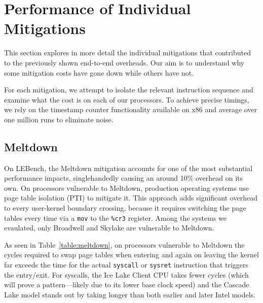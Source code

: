 \section{Performance of Individual Mitigations}
\label{s:evolution-eval}

This section explores in more detail the individual mitigations that contributed
to the previously shown end-to-end overheads.
Our aim is to understand why some mitigation costs have gone down while others have not.

For each mitigation, we attempt to isolate the relevant instruction sequence and examine what the cost is on each of our processors.
To achieve precise timings, we rely on the timestamp counter functionality available on x86 and average over one million runs to eliminate noise.

\subsection{Meltdown}

On LEBench, the Meltdown mitigation accounts for one of the most substantial performance impacts, singlehandedly causing an around 10\% overhead on its own.
On processors vulnerable to Meltdown, production operating systems use page table isolation (PTI) to mitigate it.
This approach adds significant overhead to every user-kernel boundary crossing, because it requires switching the page tables every time via a \texttt{mov} to the \texttt{\%cr3} register.
Among the systems we evaulated, only Broadwell and Skylake are vulnerable to Meltdown.

As seen in Table~\ref{table:meltdown}, on processors vulnerable to Meltdown the cycles required to swap page tables when entering and again on leaving the kernel far exceeds the time for the actual \texttt{syscall} or \texttt{sysret} instruction that triggers the entry/exit.
For syscalls, the Ice Lake Client CPU takes fewer cycles (which will prove a pattern---likely due to its lower base clock speed) and the Cascade Lake model stands out by taking longer than both earlier and later Intel models.

